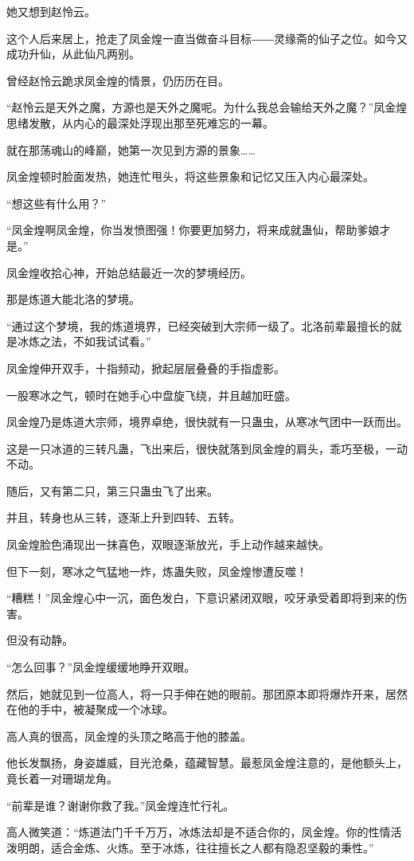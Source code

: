 \begin{this_body}
她又想到赵怜云。

这个人后来居上，抢走了凤金煌一直当做奋斗目标――灵缘斋的仙子之位。如今又成功升仙，从此仙凡两别。

曾经赵怜云跪求凤金煌的情景，仍历历在目。

“赵怜云是天外之魔，方源也是天外之魔呢。为什么我总会输给天外之魔？”凤金煌思绪发散，从内心的最深处浮现出那至死难忘的一幕。

就在那荡魂山的峰巅，她第一次见到方源的景象……

凤金煌顿时脸面发热，她连忙甩头，将这些景象和记忆又压入内心最深处。

“想这些有什么用？”

“凤金煌啊凤金煌，你当发愤图强！你要更加努力，将来成就蛊仙，帮助爹娘才是。”

凤金煌收拾心神，开始总结最近一次的梦境经历。

那是炼道大能北洛的梦境。

“通过这个梦境，我的炼道境界，已经突破到大宗师一级了。北洛前辈最擅长的就是冰炼之法，不如我试试看。”

凤金煌伸开双手，十指频动，掀起层层叠叠的手指虚影。

一股寒冰之气，顿时在她手心中盘旋飞绕，并且越加旺盛。

凤金煌乃是炼道大宗师，境界卓绝，很快就有一只蛊虫，从寒冰气团中一跃而出。

这是一只冰道的三转凡蛊，飞出来后，很快就落到凤金煌的肩头，乖巧至极，一动不动。

随后，又有第二只，第三只蛊虫飞了出来。

并且，转身也从三转，逐渐上升到四转、五转。

凤金煌脸色涌现出一抹喜色，双眼逐渐放光，手上动作越来越快。

但下一刻，寒冰之气猛地一炸，炼蛊失败，凤金煌惨遭反噬！

“糟糕！”凤金煌心中一沉，面色发白，下意识紧闭双眼，咬牙承受着即将到来的伤害。

但没有动静。

“怎么回事？”凤金煌缓缓地睁开双眼。

然后，她就见到一位高人，将一只手伸在她的眼前。那团原本即将爆炸开来，居然在他的手中，被凝聚成一个冰球。

高人真的很高，凤金煌的头顶之略高于他的膝盖。

他长发飘扬，身姿雄威，目光沧桑，蕴藏智慧。最惹凤金煌注意的，是他额头上，竟长着一对珊瑚龙角。

“前辈是谁？谢谢你救了我。”凤金煌连忙行礼。

高人微笑道：“炼道法门千千万万，冰炼法却是不适合你的，凤金煌。你的性情活泼明朗，适合金炼、火炼。至于冰炼，往往擅长之人都有隐忍坚毅的秉性。”


\end{this_body}
